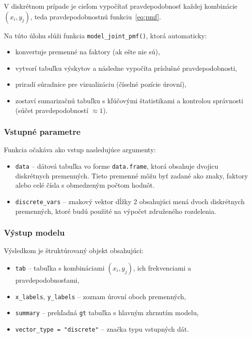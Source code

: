 V diskrétnom prípade je cieľom vypočítať pravdepodobnosť každej kombinácie $(x_i, y_j)$, teda pravdepodobnostnú funkciu~\ref{eq:pmf}.

Na túto úlohu slúži funkcia \texttt{model\_joint\_pmf()}, ktorá automaticky:
\begin{itemize}
\setlength{\itemsep}{0pt}
  \setlength{\parskip}{0pt}
  \item konvertuje premenné na faktory (ak ešte nie sú),
  \item vytvorí tabuľku výskytov a následne vypočíta príslušné pravdepodobnosti,
  \item priradí súradnice pre vizualizáciu (číselné pozície úrovní),
  \item zostaví sumarizačnú tabuľku s kľúčovými štatistikami a kontrolou správnosti (súčet pravdepodobností $\approx 1$).
\end{itemize}

\subsubsection{Vstupné parametre}
Funkcia očakáva ako vstup nasledujúce argumenty:

\begin{itemize}
\setlength{\itemsep}{0pt}
  \setlength{\parskip}{0pt}
  \item \texttt{data} – dátová tabuľka vo forme \texttt{data.frame}, ktorá obsahuje dvojicu diskrétnych premenných. Tieto premenné môžu byť zadané ako znaky, faktory alebo celé čísla s obmedzeným počtom hodnôt.
  \item \texttt{discrete\_vars} – znakový vektor dĺžky 2 obsahujúci mená dvoch diskrétnych premenných, ktoré budú použité na výpočet združeného rozdelenia.
\end{itemize}

\subsubsection{Výstup modelu}
Výsledkom je štruktúrovaný objekt obsahujúci:
\begin{itemize}
\setlength{\itemsep}{0pt}
  \setlength{\parskip}{0pt}
  \item \texttt{tab} – tabuľka s kombináciami $(x_i, y_j)$, ich frekvenciami a pravdepodobnosťami,
  \item \texttt{x\_labels}, \texttt{y\_labels} – zoznam úrovní oboch premenných,
  \item \texttt{summary} – prehľadná \texttt{gt} tabuľka s hlavným zhrnutím modelu,
  \item \texttt{vector\_type = "discrete"} – značka typu vstupných dát.
\end{itemize}

